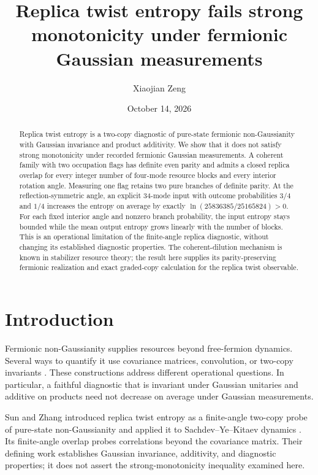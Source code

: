 \documentclass[aps,pra,reprint,amsmath,amssymb,longbibliography,floatfix]{revtex4-2}
\begin{document}
\title{Replica twist entropy fails strong monotonicity under fermionic Gaussian measurements}
\author{Xiaojian Zeng}
\date{October 14, 2026}

\begin{abstract}
Replica twist entropy is a two-copy diagnostic of pure-state fermionic
non-Gaussianity with Gaussian invariance and product additivity.
We show that it does not satisfy strong monotonicity under recorded
fermionic Gaussian measurements. A coherent family with two occupation
flags has definite even parity and admits a closed replica overlap for
every integer number of four-mode resource blocks and every interior
rotation angle. Measuring one flag retains two pure branches of definite
parity. At the reflection-symmetric angle, an explicit 34-mode input
with outcome probabilities \(3/4\) and \(1/4\) increases the entropy on
average by exactly \(\ln(25836385/25165824)>0\).
For each fixed interior angle and nonzero branch probability, the input
entropy stays bounded while the mean output entropy grows linearly with
the number of blocks. This is an operational limitation of the finite-angle
replica diagnostic, without changing its established diagnostic properties.
The coherent-dilution mechanism is known in stabilizer resource theory;
the result here supplies its parity-preserving fermionic realization and
exact graded-copy calculation for the replica twist observable.
\end{abstract}
\maketitle

\section{Introduction}

Fermionic non-Gaussianity supplies resources beyond free-fermion dynamics.
Several ways to quantify it use covariance matrices, convolution, or
two-copy invariants \cite{LeoneBittelFermionic2026,Turkeshi2026,LyuBu2024,
Coffman2025,Tarabunga2026}. These constructions address different
operational questions. In particular, a faithful diagnostic that is
invariant under Gaussian unitaries and additive on products need not
decrease on average under Gaussian measurements.

Sun and Zhang introduced replica twist entropy as a finite-angle
two-copy probe of pure-state non-Gaussianity and applied it to
Sachdev--Ye--Kitaev dynamics \cite{SunZhang2026}.
Its finite-angle overlap probes correlations beyond the covariance
matrix. Their defining work establishes Gaussian invariance, additivity,
and diagnostic properties; it does not assert the strong-monotonicity
inequality examined here.
\end{document}
